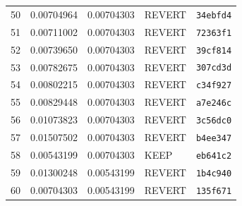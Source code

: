 \begin{longtable}{rrrll}
50 & 0.00704964 & 0.00704303 & REVERT & \texttt{34ebfd4} \\
51 & 0.00711002 & 0.00704303 & REVERT & \texttt{72363f1} \\
52 & 0.00739650 & 0.00704303 & REVERT & \texttt{39cf814} \\
53 & 0.00782675 & 0.00704303 & REVERT & \texttt{307cd3d} \\
54 & 0.00802215 & 0.00704303 & REVERT & \texttt{c34f927} \\
55 & 0.00829448 & 0.00704303 & REVERT & \texttt{a7e246c} \\
56 & 0.01073823 & 0.00704303 & REVERT & \texttt{3c56dc0} \\
57 & 0.01507502 & 0.00704303 & REVERT & \texttt{b4ee347} \\
58 & 0.00543199 & 0.00704303 & KEEP & \texttt{eb641c2} \\
59 & 0.01300248 & 0.00543199 & REVERT & \texttt{1b4c940} \\
60 & 0.00704303 & 0.00543199 & REVERT & \texttt{135f671} \\
\bottomrule
\end{longtable}
